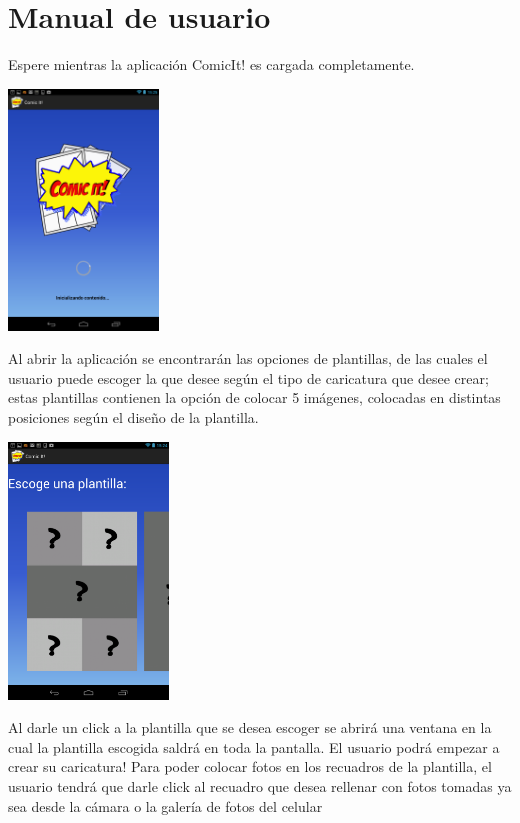 \documentclass[12pt]{report}
\begin{document}
\newpage
\chapter{Manual de usuario}

Espere mientras la aplicación ComicIt! es cargada completamente.


	\begin{center}
		\begingroup
			\includegraphics[width=0.30\textwidth]{imagenes_usuario/cargar.png}
		\endgroup
	\end{center}

Al abrir la aplicación se encontrarán las opciones de plantillas, de las cuales el usuario puede escoger la que desee según el tipo de caricatura que desee crear; estas plantillas contienen la opción de colocar 5 imágenes, colocadas en distintas posiciones según el diseño de la plantilla.

	\begin{center}
		\begingroup
			\includegraphics[width=0.32\textwidth]{imagenes_usuario/plantillas.png}
		\endgroup
	\end{center}


Al darle un click a la plantilla que se desea escoger se abrirá una ventana en la cual la plantilla escogida saldrá en toda la pantalla. El usuario podrá empezar a crear su caricatura!
Para poder colocar fotos en los recuadros de la plantilla, el usuario tendrá que darle click al recuadro que desea rellenar con fotos tomadas ya sea desde la cámara o la galería de fotos del celular
\newline
\end{document}
